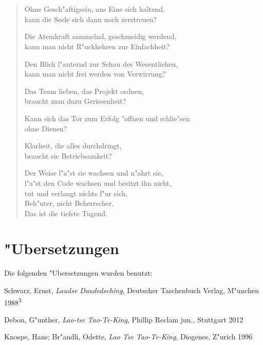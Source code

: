 \documentclass[a4paper,10pt,openany]{book}
\begin{document}
\chapter{}
\begin{verse}
Ohne Gesch"aftigsein, ans Eine sich haltend,\\
kann die Seele sich dann noch zerstreuen?

Die Atemkraft sammelnd, geschmeidig werdend,\\
kann man nicht R"uckkehren zur Einfachheit?

Den Blick l"auternd zur Schau des Wesentlichen,\\
kann man nicht frei werden von Verwirrung?

Das Team lieben, das Projekt ordnen,\\
braucht man dazu Gerissenheit?

Kann sich das Tor zum Erfolg "offnen und schlie"sen\\
ohne Dienen?

Klarheit, die alles durchdringt,\\
braucht sie Betriebsamkeit?

Der Weise l"a"st sie wachsen und n"ahrt sie,\\
l"a"st den Code wachsen und besitzt ihn nicht,\\
tut und verlangt nichts f"ur sich,\\
Beh"uter, nicht Beherrscher.\\
Das ist die tiefste Tugend.
\end{verse}


\appendix
\chapter{"Ubersetzungen}

Die folgenden "Ubersetzungen wurden benutzt:

\begin{description}
\item Schwarz, Ernst, \textit{Laudse Daudedsching}, Deutscher Taschenbuch Verlag, M"unchen 1988\textsuperscript{3}
\item Debon, G"unther, \textit{Lao-tse Tao-Te-King}, Phillip Reclam jun., Stuttgart 2012
\item Knospe, Hans; Br"andli, Odette, \textit{Lao Tse Tao-Te-King}, Diogenes, Z"urich 1996
\end{description}
\end{document}
